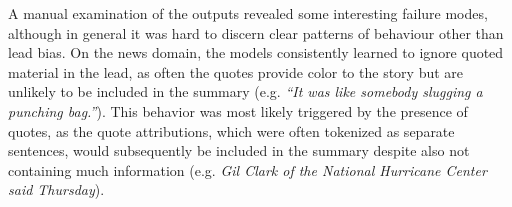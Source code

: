 A manual examination of the outputs revealed some interesting failure modes,
although in general it was hard to discern clear patterns of behaviour other
than lead bias. On the news domain, the models consistently learned to ignore
quoted material in the lead, as often the quotes provide color to the story but
are unlikely to be included in the summary (e.g. \textit{``It was like somebody
slugging a punching bag.''}).  This behavior was most likely triggered by the
presence of quotes, as the quote attributions, which were often tokenized as
separate sentences, would subsequently be included in the summary despite also
not containing much information (e.g. \textit{Gil Clark of the National
Hurricane Center said Thursday}). 
